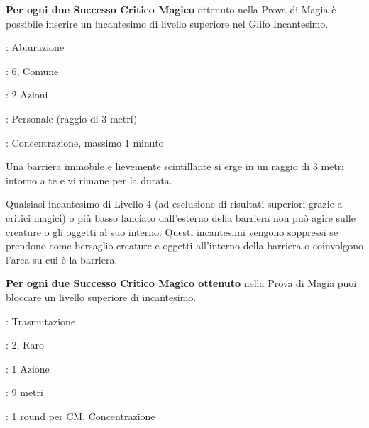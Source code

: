 \begin{multicols}{2}
\textbf{Per ogni due Successo Critico Magico} ottenuto nella Prova di Magia è possibile inserire un incantesimo di livello superiore nel Glifo Incantesimo.

\noindent\colorbox{OBSSgold!10}{
\begin{minipage}{0.95\linewidth}
\begin{description}[noitemsep, topsep=0pt, parsep=0pt, partopsep=0pt, leftmargin=0cm, labelwidth=1.3cm]
	\item[\textbf{Lista}]: Abiurazione
	\item[\textbf{Livello}]: 6, Comune
	\item[\textbf{Lancio}]: 2 Azioni
	\item[\textbf{Gittata}]: Personale (raggio di 3 metri)
	\item[\textbf{Durata}]: Concentrazione, massimo 1 minuto
\end{description}
\end{minipage}}\smallskip

Una barriera immobile e lievemente scintillante si erge in un raggio di 3 metri intorno a te e vi rimane per la durata.

Qualsiasi incantesimo di Livello 4 (ad esclusione di risultati superiori grazie a critici magici) o più basso lanciato dall'esterno della barriera non può agire sulle creature o gli oggetti al suo interno. Questi incantesimi vengono soppressi se prendono come bersaglio creature e oggetti all'interno della barriera o coinvolgono l'area su cui è la barriera.

\textbf{Per ogni due Successo Critico Magico ottenuto} nella Prova di Magia puoi bloccare un livello superiore di incantesimo.

\noindent\colorbox{OBSSgold!10}{
\begin{minipage}{0.95\linewidth}
\begin{description}[noitemsep, topsep=0pt, parsep=0pt, partopsep=0pt, leftmargin=0cm, labelwidth=1.3cm]
	\item[\textbf{Lista}]: Trasmutazione
	\item[\textbf{Livello}]: 2, Raro
	\item[\textbf{Lancio}]: 1 Azione
	\item[\textbf{Gittata}]: 9 metri
	\item[\textbf{Durata}]: 1 round per CM, Concentrazione
\end{description}
\end{minipage}}\smallskip


\end{multicols}
